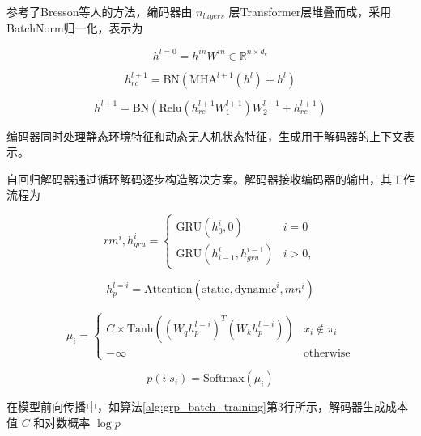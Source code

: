 \documentclass[AutoFakeBold]{LZUThesis}
\begin{document}
参考了Bresson\cite{bresson2021transformer}等人的方法，编码器由 $n_{layers}$ 层Transformer层堆叠而成，采用BatchNorm归一化，表示为

\begin{equation}
	h^{l=0} = h^{in} W^{in} \in \mathbb{R}^{n \times d_e}
	\label{eq:13a}
\end{equation}

\begin{equation}
	h_{rc}^{l+1} = \text{BN}\left(\text{MHA}^{l+1}(h^l) + h^l\right)
	\label{eq:13b}
\end{equation}

\begin{equation}
	h^{l+1} = \text{BN}\left(\text{Relu}\left(h_{rc}^{l+1} W_1^{l+1}\right) W_2^{l+1} + h_{rc}^{l+1}\right)
	\label{eq:13c}
\end{equation}

编码器同时处理静态环境特征和动态无人机状态特征，生成用于解码器的上下文表示。

自回归解码器通过循环解码逐步构造解决方案。解码器接收编码器的输出，其工作流程为

\begin{equation}
	rm^{i}, h_{gru}^{i} =
	\left\{
	\begin{array}{ll}
		\text{GRU}(h_{0}^{i}, 0)               & i = 0  \\
		\text{GRU}(h_{i-1}^{i}, h_{gru}^{i-1}) & i > 0,
	\end{array}
	\right.
	\label{eq:14}
\end{equation}

\begin{equation}
	h_{p}^{l=i} = \text{Attention}(\text{static}, \text{dynamic}^{i}, mn^{i})
	\label{eq:15a}
\end{equation}

\begin{equation}
	\mu_{i} =
	\begin{cases}
		C \times \text{Tanh}\left((W_{q}h_{p}^{l=i})^{T}(W_{k}h_{p}^{l=i})\right) & x_{i} \notin \pi_{i} \\
		-\infty                                                                   & \text{otherwise}
	\end{cases}
	\label{eq:15b}
\end{equation}

\begin{equation}
	p(i|s_{i}) = \text{Softmax}(\mu_{i})
	\label{eq:15c}
\end{equation}

在模型前向传播中，如算法\ref{alg:grp_batch_training}第3行所示，解码器生成成本值 $C$ 和对数概率 $\log p$
\end{document}
